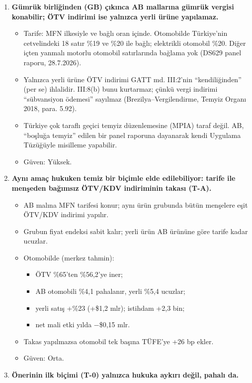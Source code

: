 \begin{enumerate}
\def\labelenumi{\arabic{enumi}.}
\tightlist
\item
  \textbf{Gümrük birliğinden (GB) çıkınca AB mallarına gümrük vergisi konabilir; ÖTV indirimi ise yalnızca yerli ürüne yapılamaz.}

  \begin{itemize}
  \tightlist
  \item
    Tarife: MFN ilkesiyle ve bağlı oran içinde. Otomobilde Türkiye'nin cetvelindeki 18 satır \%19 ve \%20 ile bağlı; elektrikli otomobil \%20. Diğer içten yanmalı motorlu otomobil satırlarında bağlama yok (DS629 panel raporu, 28.7.2026).
  \item
    Yalnızca yerli ürüne ÖTV indirimi GATT md. III:2'nin ``kendiliğinden'' (per se) ihlalidir. III:8(b) bunu kurtarmaz; çünkü vergi indirimi ``sübvansiyon ödemesi'' sayılmaz (Brezilya--Vergilendirme, Temyiz Organı 2018, para. 5.92).
  \item
    Türkiye çok taraflı geçici temyiz düzenlemesine (MPIA) taraf değil. AB, ``boşluğa temyiz'' edilen bir panel raporuna dayanarak kendi Uygulama Tüzüğüyle misilleme yapabilir.
  \item
    \etiketV{} Güven: Yüksek.
  \end{itemize}
\item
  \textbf{Aynı amaç hukuken temiz bir biçimle elde edilebiliyor: tarife ile menşeden bağımsız ÖTV/KDV indiriminin takası (T-A).}

  \begin{itemize}
  \tightlist
  \item
    AB malına MFN tarifesi konur; aynı ürün grubunda bütün menşelere eşit ÖTV/KDV indirimi yapılır.
  \item
    Grubun fiyat endeksi sabit kalır; yerli ürün AB ürününe göre tarife kadar ucuzlar.
  \item
    Otomobilde (merkez tahmin):

    \begin{itemize}
    \tightlist
    \item
      ÖTV \%65'ten \%56,2'ye iner;
    \item
      AB otomobili \%4,1 pahalanır, yerli \%5,4 ucuzlar;
    \item
      yerli satış +\%23 (+\$1,2 mlr); istihdam +2,3 bin;
    \item
      net mali etki yılda −\$0,15 mlr.
    \end{itemize}
  \item
    Takas yapılmazsa otomobil tek başına TÜFE'ye +26 bp ekler.
  \item
    \etiketT{} Güven: Orta.
  \end{itemize}
\item
  \textbf{Önerinin ilk biçimi (T-0) yalnızca hukuka aykırı değil, pahalı da.}


\end{enumerate}
